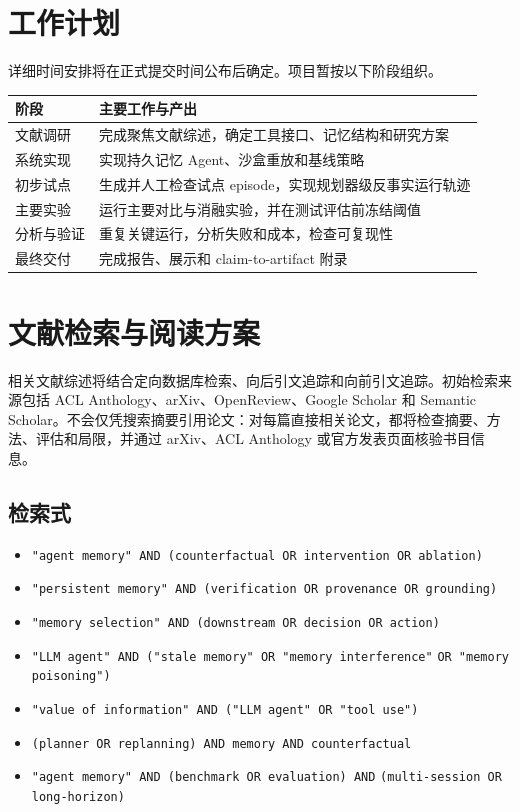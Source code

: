 \documentclass[11pt]{article}
\begin{document}
\section{工作计划}

详细时间安排将在正式提交时间公布后确定。项目暂按以下阶段组织。

\begin{table}[h]
\centering
\small
\begin{tabularx}{\textwidth}{p{}X}
\toprule
\textbf{阶段} & \textbf{主要工作与产出} \\
\midrule
文献调研 & 完成聚焦文献综述，确定工具接口、记忆结构和研究方案 \\
系统实现 & 实现持久记忆 Agent、沙盒重放和基线策略 \\
初步试点 & 生成并人工检查试点 episode，实现规划器级反事实运行轨迹 \\
主要实验 & 运行主要对比与消融实验，并在测试评估前冻结阈值 \\
分析与验证 & 重复关键运行，分析失败和成本，检查可复现性 \\
最终交付 & 完成报告、展示和 claim-to-artifact 附录 \\
\bottomrule
\end{tabularx}
\end{table}

\appendix
\section{文献检索与阅读方案}
\label{app:literature}

相关文献综述将结合定向数据库检索、向后引文追踪和向前引文追踪。初始检索来源包括 ACL Anthology、arXiv、OpenReview、Google Scholar 和 Semantic Scholar。不会仅凭搜索摘要引用论文：对每篇直接相关论文，都将检查摘要、方法、评估和局限，并通过 arXiv、ACL Anthology 或官方发表页面核验书目信息。

\subsection{检索式}

\begin{itemize}
  \item \texttt{"agent memory" AND (counterfactual OR intervention OR ablation)}
  \item \texttt{"persistent memory" AND (verification OR provenance OR grounding)}
  \item \texttt{"memory selection" AND (downstream OR decision OR action)}
  \item \texttt{"LLM agent" AND ("stale memory" OR "memory interference"}\newline
  \hspace*{1em}\texttt{OR "memory poisoning")}
  \item \texttt{"value of information" AND ("LLM agent" OR "tool use")}
  \item \texttt{(planner OR replanning) AND memory AND counterfactual}
  \item \texttt{"agent memory" AND (benchmark OR evaluation) AND}\newline
  \hspace*{1em}\texttt{(multi-session OR long-horizon)}
\end{itemize}
\end{document}
